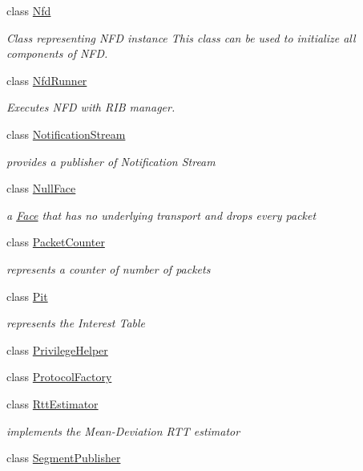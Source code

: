 \begin{DoxyCompactItemize}
class \hyperlink{classnfd_1_1Nfd}{Nfd}
\begin{DoxyCompactList}\small\item\em Class representing N\+FD instance This class can be used to initialize all components of N\+FD. \end{DoxyCompactList}\item 
class \hyperlink{classnfd_1_1NfdRunner}{Nfd\+Runner}
\begin{DoxyCompactList}\small\item\em Executes N\+FD with R\+IB manager. \end{DoxyCompactList}\item 
class \hyperlink{classnfd_1_1NotificationStream}{Notification\+Stream}
\begin{DoxyCompactList}\small\item\em provides a publisher of Notification Stream \end{DoxyCompactList}\item 
class \hyperlink{classnfd_1_1NullFace}{Null\+Face}
\begin{DoxyCompactList}\small\item\em a \hyperlink{classnfd_1_1Face}{Face} that has no underlying transport and drops every packet \end{DoxyCompactList}\item 
class \hyperlink{classnfd_1_1PacketCounter}{Packet\+Counter}
\begin{DoxyCompactList}\small\item\em represents a counter of number of packets \end{DoxyCompactList}\item 
class \hyperlink{classnfd_1_1Pit}{Pit}
\begin{DoxyCompactList}\small\item\em represents the Interest Table \end{DoxyCompactList}\item 
class \hyperlink{classnfd_1_1PrivilegeHelper}{Privilege\+Helper}
\item 
class \hyperlink{classnfd_1_1ProtocolFactory}{Protocol\+Factory}
\item 
class \hyperlink{classnfd_1_1RttEstimator}{Rtt\+Estimator}
\begin{DoxyCompactList}\small\item\em implements the Mean-\/\+Deviation R\+TT estimator \end{DoxyCompactList}\item 
class \hyperlink{classnfd_1_1SegmentPublisher}{Segment\+Publisher}

\end{DoxyCompactItemize}
